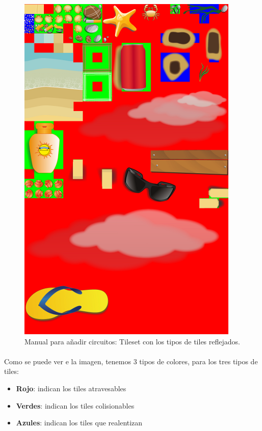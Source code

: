 \begin{figure}[H]
  \label{mixed_beach}
  \begin{center}
    \includegraphics[scale=0.4]{imagenes/manualcircuito/mixedbeach.png}
  \end{center}
  \caption{Manual para añadir circuitos: Tileset con los tipos de tiles reflejados.}
\end{figure}

\paragraph{}
Como se puede ver e la imagen, tenemos 3 tipos de colores, para los tres tipos de tiles:

\begin{itemize}
    \item \textbf{Rojo}: indican los tiles atravesables
    \item \textbf{Verdes}: indican los tiles colisionables
    \item \textbf{Azules}: indican los tiles que realentizan
\end{itemize}

